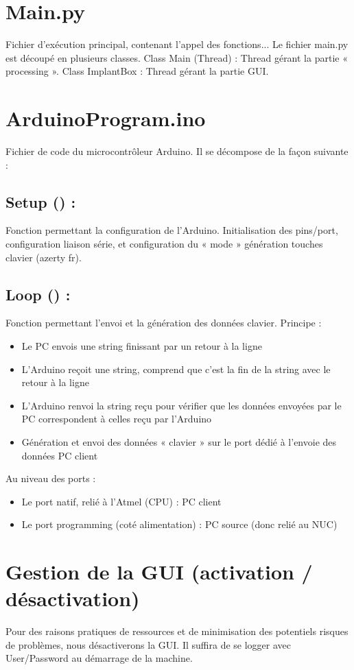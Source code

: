 \section{Main.py}
Fichier d’exécution principal, contenant l’appel des fonctions...
Le fichier main.py est découpé en plusieurs classes.
Class Main (Thread) : Thread gérant la partie « processing ».
Class ImplantBox : Thread gérant la partie GUI.

\section{ArduinoProgram.ino}
Fichier de code du microcontrôleur Arduino. Il se décompose de la façon suivante :
\subsection{Setup () :}
Fonction permettant la configuration de l’Arduino. Initialisation des pins/port, configuration liaison série, et configuration du « mode » génération touches clavier (azerty fr).
\subsection{Loop () :}
Fonction permettant l’envoi et la génération des données clavier.
Principe :
\begin{itemize}
    \item Le PC envois une string finissant par un retour à la ligne
    \item L’Arduino reçoit une string, comprend que c’est la fin de la string avec le retour à la ligne
    \item L’Arduino renvoi la string reçu pour vérifier que les données envoyées par le PC correspondent à celles reçu par l’Arduino
    \item Génération et envoi des données « clavier » sur le port dédié à l’envoie des données PC client
\end{itemize}
Au niveau des ports :
\begin{itemize}
    \item Le port natif, relié à l’Atmel (CPU) : PC client
    \item Le port programming (coté alimentation) : PC source (donc relié au NUC)
\end{itemize}


\section{Gestion de la GUI (activation / désactivation)}
Pour des raisons pratiques de ressources et de minimisation des potentiels risques de problèmes, nous désactiverons la GUI. Il suffira de se logger avec User/Password au démarrage de la machine.

